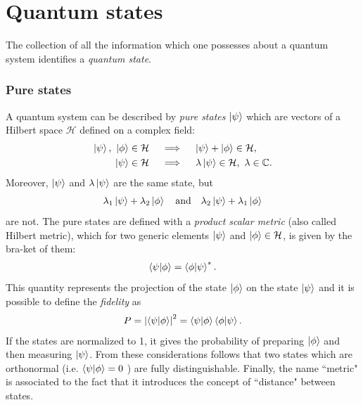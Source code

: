 \section{Quantum states}

The collection of all the information which one possesses about a quantum system identifies a \textit{quantum state}. 

\subsubsection{Pure states}

A quantum system can be described by \textit{pure states} $\ket{\psi}$ which are vectors of a Hilbert space $\mathcal{H}$ defined on a complex field:
\begin{align*}
    \ket{\psi}, ~\ket{\phi} \in \mathcal{H} \quad & \implies \quad \ket{\psi} + \ket{\phi} \in \mathcal{H}, \\ 
    \ket{\psi} \in \mathcal{H} \quad & \implies \quad \lambda \ket{\psi} \in \mathcal{H}, ~ \lambda \in \mathbb{C}.
\end{align*}
Moreover, $\ket{\psi}$ and $\lambda \ket{\psi}$ are the same state, but
\begin{align*}
    \lambda_1 \ket{\psi} + \lambda_2 \ket{\phi}  \quad  \text{and} \quad \lambda_2 \ket{\psi} + \lambda_1 \ket{\phi} 
\end{align*}
are not. 
\newline
The pure states are defined with a \textit{product scalar metric} (also called Hilbert metric), which for two generic elements $\ket{\psi}$ and $\ket{\phi} \in \mathcal{H}$, is given by the bra-ket of them:
\begin{align*}
    \braket{\psi}{\phi} = \braket{\phi}{\psi}^*.
\end{align*}
This quantity represents the projection of the state $\ket{\phi}$ on the state $\ket{\psi}$ and it is possible to define the \textit{fidelity} as 
\begin{align*}
    P = \abs{\braket{\psi}{\phi}}^2 = \braket{\psi}{\phi} \braket{\phi}{\psi}.
\end{align*}
If the states are normalized to 1, it gives the probability of preparing $\ket{\phi}$ and then measuring $\ket{\psi}$. From these considerations follows that two states which are orthonormal (i.e. $\braket{\psi}{\phi} = 0$ ) are fully distinguishable. 
\newline
Finally, the name ``metric" is associated to the fact that it introduces the concept of ``distance" between states. 


